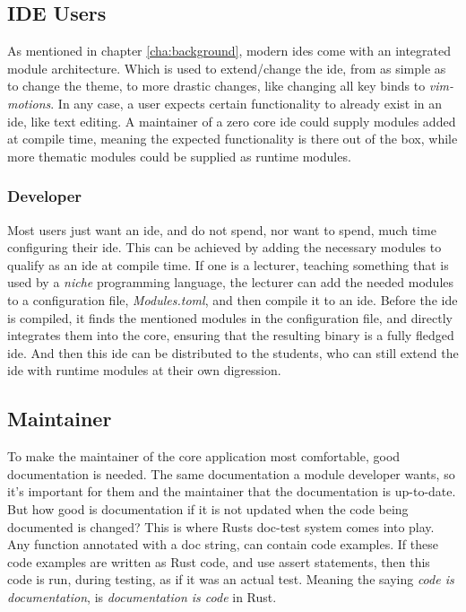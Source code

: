 \subsection{IDE Users}

As mentioned in chapter \ref{cha:background}, modern \gls{ide}s come with an
integrated module architecture. Which is used to extend/change the \gls{ide},
from as simple as to change the theme, to more drastic changes, like changing
all key binds to \textit{vim-motions}. In any case, a user expects certain
functionality to already exist in an \gls{ide}, like text editing. A maintainer
of a zero core \gls{ide} could supply modules added at compile time, meaning the
expected functionality is there out of the box, while more thematic modules
could be supplied as runtime modules.


\subsubsection{Developer}

Most users just want an \gls{ide}, and do not spend, nor want to spend, much
time configuring their \gls{ide}. This can be achieved by adding the necessary
modules to qualify as an \gls{ide} at compile time. If one is a lecturer,
teaching something that is used by a \textit{niche} programming language, the
lecturer can add the needed modules to a configuration file,
\textit{Modules.toml}, and then compile it to an \gls{ide}. Before the \gls{ide}
is compiled, it finds the mentioned modules in the configuration file, and
directly integrates them into the core, ensuring that the resulting binary is a
fully fledged \gls{ide}. And then this \gls{ide} can be distributed to the
students, who can still extend the \gls{ide} with runtime modules at their own
digression.

\subsection{Maintainer}

To make the maintainer of the core application most comfortable, good
documentation is needed. The same documentation a module developer wants, so
it's important for them and the maintainer that the documentation is up-to-date.
But how good is documentation if it is not updated when the code being
documented is changed? This is where Rusts doc-test system comes into play. Any
function annotated with a doc string, can contain code examples. If these code
examples are written as Rust code, and use assert statements, then this code is
run, during testing, as if it was an actual test. Meaning the saying
\textit{code is documentation}, is \textit{documentation is code} in Rust.

